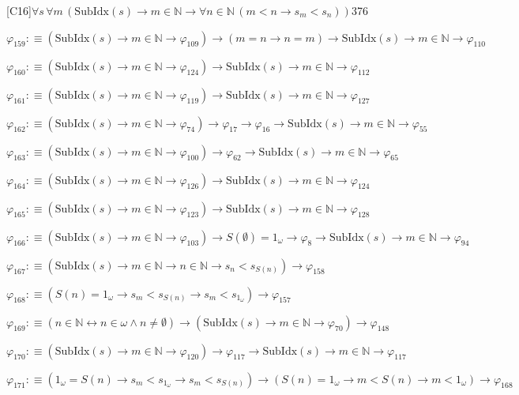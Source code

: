 \begin{fullproof}{[C16]}{$\forall s\,\forall m\,(\mathrm{SubIdx}(s) \to m \in \mathbb{N} \to \forall n \in \mathbb{N}\,(m < n \to s_{m} < s_{n}))$}{376}
\begin{abbrevlist}
\item $\varphi_{159} :\equiv (\mathrm{SubIdx}(s) \to m \in \mathbb{N} \to \varphi_{109}) \to (m = n \to n = m) \to \mathrm{SubIdx}(s) \to m \in \mathbb{N} \to \varphi_{110}$
\item $\varphi_{160} :\equiv (\mathrm{SubIdx}(s) \to m \in \mathbb{N} \to \varphi_{124}) \to \mathrm{SubIdx}(s) \to m \in \mathbb{N} \to \varphi_{112}$
\item $\varphi_{161} :\equiv (\mathrm{SubIdx}(s) \to m \in \mathbb{N} \to \varphi_{119}) \to \mathrm{SubIdx}(s) \to m \in \mathbb{N} \to \varphi_{127}$
\item $\varphi_{162} :\equiv (\mathrm{SubIdx}(s) \to m \in \mathbb{N} \to \varphi_{74}) \to \varphi_{17} \to \varphi_{16} \to \mathrm{SubIdx}(s) \to m \in \mathbb{N} \to \varphi_{55}$
\item $\varphi_{163} :\equiv (\mathrm{SubIdx}(s) \to m \in \mathbb{N} \to \varphi_{100}) \to \varphi_{62} \to \mathrm{SubIdx}(s) \to m \in \mathbb{N} \to \varphi_{65}$
\item $\varphi_{164} :\equiv (\mathrm{SubIdx}(s) \to m \in \mathbb{N} \to \varphi_{126}) \to \mathrm{SubIdx}(s) \to m \in \mathbb{N} \to \varphi_{124}$
\item $\varphi_{165} :\equiv (\mathrm{SubIdx}(s) \to m \in \mathbb{N} \to \varphi_{123}) \to \mathrm{SubIdx}(s) \to m \in \mathbb{N} \to \varphi_{128}$
\item $\varphi_{166} :\equiv (\mathrm{SubIdx}(s) \to m \in \mathbb{N} \to \varphi_{103}) \to S(\emptyset) = 1_{\omega} \to \varphi_{8} \to \mathrm{SubIdx}(s) \to m \in \mathbb{N} \to \varphi_{94}$
\item $\varphi_{167} :\equiv (\mathrm{SubIdx}(s) \to m \in \mathbb{N} \to n \in \mathbb{N} \to s_{n} < s_{S(n)}) \to \varphi_{158}$
\item $\varphi_{168} :\equiv (S(n) = 1_{\omega} \to s_{m} < s_{S(n)} \to s_{m} < s_{1_{\omega}}) \to \varphi_{157}$
\item $\varphi_{169} :\equiv (n \in \mathbb{N} \leftrightarrow n \in \omega \land n \neq \emptyset) \to (\mathrm{SubIdx}(s) \to m \in \mathbb{N} \to \varphi_{70}) \to \varphi_{148}$
\item $\varphi_{170} :\equiv (\mathrm{SubIdx}(s) \to m \in \mathbb{N} \to \varphi_{120}) \to \varphi_{117} \to \mathrm{SubIdx}(s) \to m \in \mathbb{N} \to \varphi_{117}$
\item $\varphi_{171} :\equiv (1_{\omega} = S(n) \to s_{m} < s_{1_{\omega}} \to s_{m} < s_{S(n)}) \to (S(n) = 1_{\omega} \to m < S(n) \to m < 1_{\omega}) \to \varphi_{168}$

\end{abbrevlist}
\end{fullproof}
